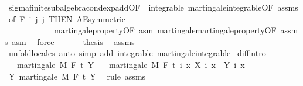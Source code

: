 \begin{isabellebody}
\ sigma{\isacharunderscore}{\kern0pt}finite{\isacharunderscore}{\kern0pt}subalgebra{\isachardot}{\kern0pt}cond{\isacharunderscore}{\kern0pt}exp{\isacharunderscore}{\kern0pt}add{\isacharbrackleft}{\kern0pt}OF\ {\isacharunderscore}{\kern0pt}\ integrable\ martingale{\isachardot}{\kern0pt}integrable{\isacharbrackleft}{\kern0pt}OF\ assms{\isacharbrackright}{\kern0pt}{\isacharcomma}{\kern0pt}\ of\ {\isachardoublequoteopen}F\ i{\isachardoublequoteclose}\ j\ j{\isacharcomma}{\kern0pt}\ THEN\ AE{\isacharunderscore}{\kern0pt}symmetric{\isacharbrackright}{\kern0pt}\isanewline
\ \ \ \ \ \ \ \ \ \ \ \ martingale{\isacharunderscore}{\kern0pt}property{\isacharbrackleft}{\kern0pt}OF\ asm{\isacharbrackright}{\kern0pt}\ martingale{\isachardot}{\kern0pt}martingale{\isacharunderscore}{\kern0pt}property{\isacharbrackleft}{\kern0pt}OF\ assms\ asm{\isacharbrackright}{\kern0pt}\ \isamarkupfalse%
\ force\isanewline
\ \ \isacommand{{\isacharbraceright}{\kern0pt}}\isamarkupfalse%
\isanewline
\ \ \isamarkupfalse%
\ {\isacharquery}{\kern0pt}thesis\ \isamarkupfalse%
\ assms\isanewline
\ \ \isamarkupfalse%
\ {\isacharparenleft}{\kern0pt}unfold{\isacharunderscore}{\kern0pt}locales{\isacharparenright}{\kern0pt}\ {\isacharparenleft}{\kern0pt}auto\ simp\ add{\isacharcolon}{\kern0pt}\ integrable\ martingale{\isachardot}{\kern0pt}integrable{\isacharparenright}{\kern0pt}\isanewline
{}\isamarkupfalse%
%
\endisatagproof
{\isafoldproof}%
%
\isadelimproof
\isanewline
%
\endisadelimproof
\isanewline
{}\isamarkupfalse%
\ diff{\isacharbrackleft}{\kern0pt}intro{\isacharbrackright}{\kern0pt}{\isacharcolon}{\kern0pt}\isanewline
\ \ \ {\isachardoublequoteopen}martingale\ M\ F\ t\ Y{\isachardoublequoteclose}\isanewline
\ \ \ {\isachardoublequoteopen}martingale\ M\ F\ t\ {\isacharparenleft}{\kern0pt}{\isasymlambda}i\ x{\isachardot}{\kern0pt}\ X\ i\ x\ {\isacharminus}{\kern0pt}\ Y\ i\ x{\isacharparenright}{\kern0pt}{\isachardoublequoteclose}\isanewline
%
\isadelimproof
%
\endisadelimproof
%
\isatagproof
{}\isamarkupfalse%
\ {\isacharminus}{\kern0pt}\isanewline
\ \ \isamarkupfalse%
\ Y{\isacharcolon}{\kern0pt}\ martingale\ M\ F\ t\ Y\ \isamarkupfalse%
\ {\isacharparenleft}{\kern0pt}rule\ assms{\isacharparenright}{\kern0pt}\isanewline
\ \ \isacommand{{\isacharbraceleft}{\kern0pt}}\isamarkupfalse%
\isanewline
\ \ \ \ \isamarkupfalse%

\end{isabellebody}
